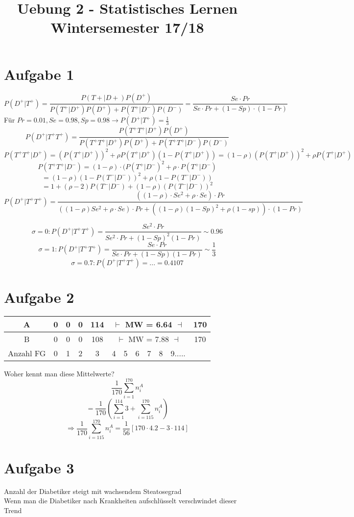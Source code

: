 \documentclass[10pt,a4paper]{article}
\title{Uebung 2 - Statistisches Lernen\\ \large{Wintersemester 17/18}}
\date{}
\begin{document}
	\maketitle
\section{Aufgabe 1}
\[P(D^+ | T^+) = \frac{P(T+|D+) P(D^+) }{ P(T^+|D^+) P(D^+) + P(T^+ | D^-) P(D^-) } = \frac{Se \cdot Pr}{ Se \cdot Pr + (1-Sp) \cdot (1-Pr)} \]
Für $Pr=0.01, Se=0.98, Sp=0.98 \rightarrow  P(D^+ | T^+)= \frac{1}{3} $
\[P(D^+ | T^+ T^+)=\frac{P(T^+ T^+ | D^+) P(D^+)}{P(T^+ T^+ | D^+) P(D^+) + P(T^+T^+|D^-) P(D^-)} \]
\[P(T^+ T^+| D^+) = \left( P(T^+|D^+) \right)^2 + \rho P(T^+ | D^+)(1-P(T^+|D^+)) = (1 - \rho)(P(T^+|D^+))^2 + \rho P(T^+|D^+) \]
\[ P(T^+ T^+|D^-) = (1- \rho) \cdot (P(T^+ | D^-)^2 + \rho \cdot P(T^+ | D^-) \]
\[ = (1 - \rho) (1-P(T^-|D^-))^2 + \rho (1-P(T^-|D^-)) \]
\[ = 1 + (\rho -2) P(T^- | D^-) + (1- \rho) (P(T^-|D^-))^2\]
\[ P(D^+ | T^+ T^+)= \frac{((1-\rho) \cdot Se^2 + \rho \cdot Se) \cdot Pr}{((1-\rho)Se^2 + \rho \cdot Se)\cdot Pr + ((1-\rho)(1-Sp)^2 + \rho(1-sp))\cdot (1-Pr)} \]

\[ \sigma = 0: P(D^+|T^+T^+)= \frac{Se^2 \cdot Pr}{Se^2 \cdot Pr + (1-Sp)^2(1-Pr)} \sim 0.96 \]
\[ \sigma = 1: P(D^+|T^+T^+)= \frac{Se \cdot Pr}{Se \cdot Pr + (1-Sp)(1-Pr)} \sim \frac{1}{3} \]
\[ \sigma = 0.7: P(D^+|T^+T^+)= ... = 0.4107 \]

\section{Aufgabe 2}
\begin{tabular}{c|cccccccccc|c}
A & 0 & 0 & 0 & 114 & \multicolumn{6}{c|}{$\vdash $ MW = 6.64 $ \dashv$} &170 \\ \hline
B & 0 & 0 & 0 & 108 & \multicolumn{6}{c|}{$\vdash $ MW = 7.88 $ \dashv$} &170 \\ \hline
Anzahl FG & 0 & 1 & 2 & 3 & 4 & 5 & 6 & 7 & 8 & 9..... &  \\ 
\end{tabular} 

Woher kennt man diese Mittelwerte?
\[ \frac{1}{170} \sum\limits_{i=1}^{170} n_i^A \]
\[ = \frac{1}{170} \left( \sum\limits_{i=1}^{114} 3 + \sum\limits_{i=115}^{170} n_i^A \right) \]
\[ \Rightarrow \frac{1}{170} \sum\limits_{i=115}^{170} n_i^A = \frac{1}{56} \left[ 170 \cdot 4.2 - 3 \cdot 114 \right] \]

\section{Aufgabe 3}
Anzahl der Diabetiker steigt mit wachsendem Steatosegrad \\
Wenn man die Diabetiker nach Krankheiten aufschlüsselt verschwindet dieser Trend
\end{document}
